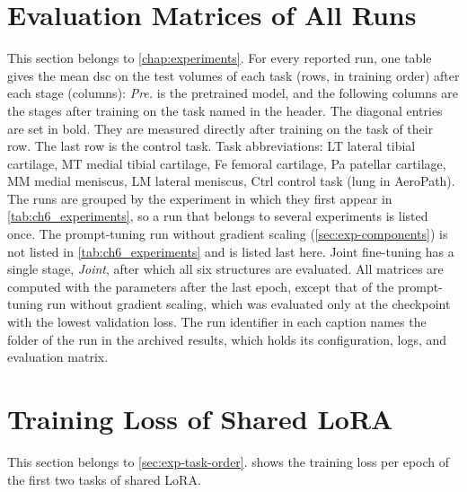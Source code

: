 \FloatBarrier
\section{Evaluation Matrices of All Runs}
\label{sec:app-matrices}

This section belongs to \cref{chap:experiments}.
For every reported run, one table gives the mean \gls{dsc} on the test volumes of each task (rows, in training order) after each stage (columns): \emph{Pre.} is the pretrained model, and the following columns are the stages after training on the task named in the header.
The diagonal entries are set in bold.
They are measured directly after training on the task of their row.
The last row is the control task.
Task abbreviations: LT lateral tibial cartilage, MT medial tibial cartilage, Fe femoral cartilage, Pa patellar cartilage, MM medial meniscus, LM lateral meniscus, Ctrl control task (lung in AeroPath).
The runs are grouped by the experiment in which they first appear in \cref{tab:ch6_experiments}, so a run that belongs to several experiments is listed once.
The prompt-tuning run without gradient scaling (\cref{sec:exp-components}) is not listed in \cref{tab:ch6_experiments} and is listed last here.
Joint fine-tuning has a single stage, \emph{Joint}, after which all six structures are evaluated.
All matrices are computed with the parameters after the last epoch, except that of the prompt-tuning run without gradient scaling, which was evaluated only at the checkpoint with the lowest validation loss.
The run identifier in each caption names the folder of the run in the archived results, which holds its configuration, logs, and evaluation matrix.

\raggedbottom


\FloatBarrier
\section{Training Loss of Shared LoRA}
\label{sec:app-shared-loss}

This section belongs to \cref{sec:exp-task-order}.
 shows the training loss per epoch of the first two tasks of shared LoRA.

